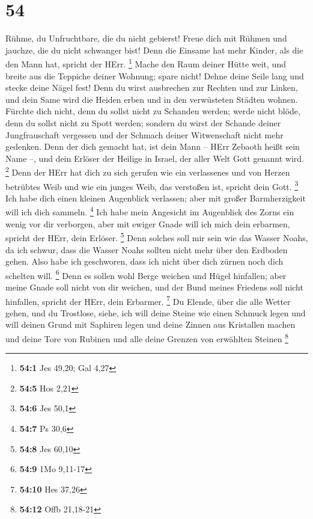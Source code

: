 \hypertarget{section-20}{%
\section{54}\label{section-20}}

 Rühme, du Unfruchtbare, die du nicht gebierst! Freue dich
mit Rühmen und jauchze, die du nicht schwanger bist! Denn die Einsame
hat mehr Kinder, als die den Mann hat, spricht der HErr. \footnote{\textbf{54:1}
  Jes 49,20; Gal 4,27}  Mache den Raum deiner Hütte weit,
und breite aus die Teppiche deiner Wohnung; spare nicht! Dehne deine
Seile lang und stecke deine Nägel fest!  Denn du wirst
ausbrechen zur Rechten und zur Linken, und dein Same wird die Heiden
erben und in den verwüsteten Städten wohnen.  Fürchte dich
nicht, denn du sollst nicht zu Schanden werden; werde nicht blöde, denn
du sollst nicht zu Spott werden; sondern du wirst der Schande deiner
Jungfrauschaft vergessen und der Schmach deiner Witwenschaft nicht mehr
gedenken.  Denn der dich gemacht hat, ist dein Mann -- HErr
Zebaoth heißt sein Name --, und dein Erlöser der Heilige in Israel, der
aller Welt Gott genannt wird. \footnote{\textbf{54:5} Hos 2,21}
 Denn der HErr hat dich zu sich gerufen wie ein verlassenes
und von Herzen betrübtes Weib und wie ein junges Weib, das verstoßen
ist, spricht dein Gott. \footnote{\textbf{54:6} Jes 50,1} 
Ich habe dich einen kleinen Augenblick verlassen; aber mit großer
Barmherzigkeit will ich dich sammeln. \footnote{\textbf{54:7} Ps 30,6}
 Ich habe mein Angesicht im Augenblick des Zorns ein wenig
vor dir verborgen, aber mit ewiger Gnade will ich mich dein erbarmen,
spricht der HErr, dein Erlöser. \footnote{\textbf{54:8} Jes 60,10}
 Denn solches soll mir sein wie das Wasser Noahs, da ich
schwur, dass die Wasser Noahs sollten nicht mehr über den Erdboden
gehen. Also habe ich geschworen, dass ich nicht über dich zürnen noch
dich schelten will. \footnote{\textbf{54:9} 1Mo 9,11-17} 
Denn es sollen wohl Berge weichen und Hügel hinfallen; aber meine Gnade
soll nicht von dir weichen, und der Bund meines Friedens soll nicht
hinfallen, spricht der HErr, dein Erbarmer. \footnote{\textbf{54:10} Hes
  37,26}  Du Elende, über die alle Wetter gehen, und du
Trostlose, siehe, ich will deine Steine wie einen Schmuck legen und will
deinen Grund mit Saphiren legen  und deine Zinnen aus
Kristallen machen und deine Tore von Rubinen und alle deine Grenzen von
erwählten Steinen \footnote{\textbf{54:12} Offb 21,18-21} 
